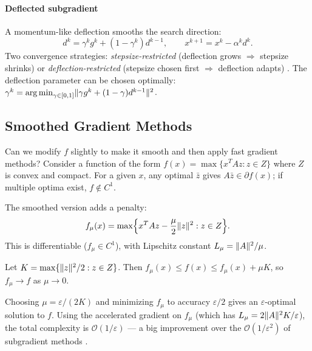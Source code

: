 \paragraph{Deflected subgradient}

A momentum-like deflection smooths the search direction:
\begin{equation}\label{eq:deflected-subgradient}
	d^k = \gamma^k g^k + (1 - \gamma^k) d^{k-1},
	\qquad
	x^{k+1} = x^k - \alpha^k d^k.
\end{equation}
Two convergence strategies: \textit{stepsize-restricted} (deflection grows $\Rightarrow$ stepsize shrinks) or \textit{deflection-restricted} (stepsize chosen first $\Rightarrow$ deflection adapts) \cite{dantonio2009}.
The deflection parameter can be chosen optimally: $\gamma^k = \operatorname*{arg\,min}_{\gamma \in [0,1]} \lVert\gamma g^k + (1 - \gamma) d^{k-1}\rVert^2$.


\subsection{Smoothed Gradient Methods}\label{ssec:smoothing}

Can we modify $f$ slightly to make it smooth and then apply fast gradient methods?
Consider a function of the form $f(x) = \max\{x^T A z : z \in Z\}$ where $Z$ is convex and compact.
For a given $x$, any optimal $\bar{z}$ gives $A\bar{z} \in \partial f(x)$; if multiple optima exist, $f \notin C^1$.

The smoothed version adds a penalty:
\begin{equation}\label{eq:smoothed-objective}
	f_\mu(x) = \max\Bigl\{x^T A z - \frac{\mu}{2}\lVert z\rVert^2 : z \in Z\Bigr\}.
\end{equation}
This is differentiable ($f_\mu \in C^1$), with Lipschitz constant $L_\mu = \lVert A\rVert^2 / \mu$.

\begin{thm}\label{thm:smoothing}
	Let $K = \max\{\lVert z\rVert^2/2 : z \in Z\}$.
	Then $f_\mu(x) \leq f(x) \leq f_\mu(x) + \mu K$, so $f_\mu \to f$ as $\mu \to 0$.
\end{thm}

Choosing $\mu = \varepsilon/(2K)$ and minimizing $f_\mu$ to accuracy $\varepsilon/2$ gives an $\varepsilon$-optimal solution to $f$.
Using the accelerated gradient on $f_\mu$ (which has $L_\mu = 2\lVert A\rVert^2 K / \varepsilon$), the total complexity is $\mathcal{O}(1/\varepsilon)$ --- a big improvement over the $\mathcal{O}(1/\varepsilon^2)$ of subgradient methods \cite{nesterov2005}.

